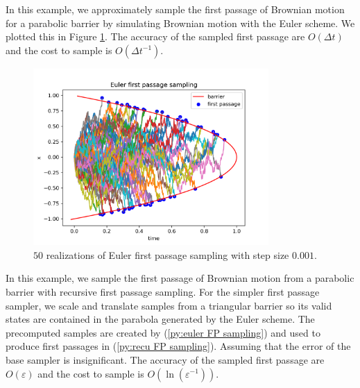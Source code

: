\documentclass[a4paper,12pt]{article}
\begin{document}
\begin{example}
    In this example, we approximately sample the first passage of Brownian motion
    for a parabolic barrier by simulating Brownian motion with the Euler scheme. We plotted
    this in Figure \ref{fig:Euler first passage para}. The accuracy of the sampled first passage
    are $O(\Delta t)$ and the cost to sample is $O(\Delta t ^{-1})$.


    \begin{figure}[h!]
        \centering
        \includegraphics[width=0.8\textwidth]{plots/Euler first passage para.png}
        \caption{ $50$ realizations of Euler first passage sampling with step size $0.001$.}
        \label{fig:Euler first passage para}
    \end{figure}
\end{example}


\begin{example} \label{ex:recursive first passage sampling}
    In this example, we sample the first passage of Brownian motion from a parabolic barrier
    with recursive first passage sampling.
    For the simpler first passage sampler, we scale and translate
    samples from a triangular barrier so its
    valid states are contained in the parabola generated
    by the Euler scheme. The precomputed samples are created
    by (\ref{py:euler FP sampling}) and used to produce first passages
    in (\ref{py:recu FP sampling}).
    Assuming that the error of the base sampler is insignificant.
    The accuracy of the sampled first passage
    are $O(\varepsilon)$ and the cost to sample is $O(\ln \left(\varepsilon^{-1}\right))$.

\end{example}
\end{document}
